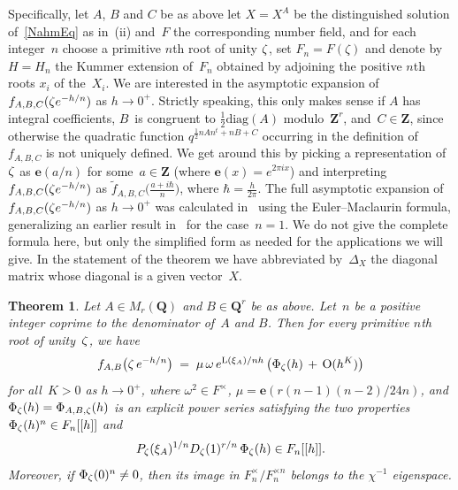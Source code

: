 \documentclass[12pt,reqno]{amsart}
\newtheorem{theorem}{Theorem}[section]
\theoremstyle{definition}
\newcommand{\changed}[1]{{#1}}
\def\+{\,+\,}
\def\={\;=\;}
\def\Q{\mathbf Q}   %
\def\Z{\mathbf Z}   %
\def\X{X}   %
\def\tf{\widetilde f}
\def\BQ{\mathbf Q}
\def\BQ{\Q}
\def\D{\Delta}
\def\L{\mathrm L}
\def\diag{\mathrm{diag}}
\def\nn{n}
\def\e{\mathbf{e}}
\begin{document}
Specifically, let $A$, $B$ and $C$ be as above let $\X=\X^A$ be the 
distinguished solution of~\eqref{NahmEq} as in~(ii) and~$F$ the 
corresponding number field, and for each integer~$\nn$ choose a primitive 
$\nn$th root of unity $\zeta$, set $F_\nn=F(\zeta)$ and denote by $H=H_\nn$ the 
Kummer extension of~$F_\nn$ obtained by adjoining the positive $\nn$th roots 
$x_i$ of the~$X_i$. We are interested in the asymptotic expansion of 
$f_{A,B,C}(\zeta e^{-h/n})$ as $h\to0^+$. 
Strictly speaking, this only makes sense if $A$ has integral 
coefficients, $B$~is congruent to $\frac12\text{diag}(A)$ modulo~$\Z^r$, 
and~$C\in\Z$, since otherwise the quadratic function $q^{\frac12nAn^t+nB+C}$ 
occurring in the definition of $f_{A,B,C}$ is not uniquely defined. 
We get around this by picking a representation of~$\zeta$ 
as $\e(a/n)$ for some~$a\in\Z$ \changed{(where $\e(x)=e^{2\pi i x}$)}
and interpreting $f_{A,B,C}(\zeta e^{-h/n})$ as 
$\tf_{A,B,C}\bigl(\frac{a+i\hbar}n\bigr)$, where $\hbar=\frac h{2\pi}$.
The full asymptotic expansion of $f_{A,B,C}(\zeta e^{-h/n})$ as $h\to0^+$ was 
calculated in~\cite{GZ:asymptotics} using the Euler--Maclaurin formula, 
generalizing an earlier result in~\cite{Zagier} for the case~$n=1$. 
We do not give the complete formula here, but only the simplified form 
as needed for the applications we will give. In the statement of the theorem
we have abbreviated by~$\D_X$ the diagonal matrix whose diagonal is a 
\changed{given} vector~$\X$. 


\begin{theorem}\cite[Thm~3.1]{GZ:asymptotics}
\label{thm.nahmEM}
Let \changed{$A \in M_r(\BQ)$ and $B \in \BQ^r$} be as above.
Let~$\nn$ be a positive integer coprime to the denominator of~$A$ and $B$.
Then for every primitive $\nn$th root of unity~$\zeta$, we have
\begin{equation}
\label{eq.nahmEM}
f_{A,B} \bigl(\z\,e^{-h/\nn}\bigr)  \=  \mu \, \omega 
\,e^{\L(\xi_A)/\nn h}\, \bigl(\Phi_\z(h) \+ \text{O}(h^K)\bigr)
\end{equation}
for all~$K>0$ as $h\to0^+$, where $\omega^2 \in F^\times$, 
\changed{$\mu = \e(r(\nn-1)(\nn-2)/24 \nn)$},
and 
$\Phi_\zeta(h)=\Phi_{A,B,\zeta}(h)$ is an explicit power series satisfying the two 
properties~$ \Phi_\z(h)^\nn\in F_\nn[[h]]$ and 
\begin{equation}
P_\z(\xi_A)^{1/n} \changed{D_{\z}(1)^{r/n}} \,\Phi_\z(h)\in F_\nn[[h]].
\end{equation}
Moreover, if 
$\Phi_\z(0)^\nn \neq 0$, then
its image in $F_\nn^\times/F_\nn^{\times \nn}$ belongs to 
the $\chi^{-1}$ eigenspace.
\end{theorem}
\end{document}
